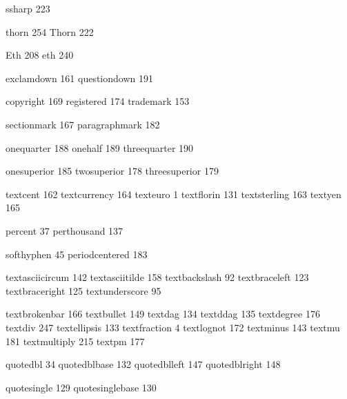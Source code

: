  ssharp           223

 thorn            254
 Thorn            222

 Eth              208
 eth              240

 exclamdown       161
 questiondown     191

 copyright        169
 registered       174
 trademark        153

 sectionmark      167
 paragraphmark    182

 onequarter       188
 onehalf          189
 threequarter     190

 onesuperior      185
 twosuperior      178
 threesuperior    179

 textcent         162 %
 textcurrency     164
 texteuro           1
 textflorin       131
 textsterling     163
 textyen          165

 percent           37
 perthousand      137

 softhyphen        45
 periodcentered   183

 textasciicircum  142
 textasciitilde   158
 textbackslash     92
 textbraceleft    123
 textbraceright   125
 textunderscore    95

 textbrokenbar    166
 textbullet       149
 textdag          134
 textddag         135
 textdegree       176
 textdiv          247
 textellipsis     133
 textfraction       4
 textlognot       172
 textminus        143
 textmu           181
 textmultiply     215
 textpm           177

 quotedbl          34
 quotedblbase     132
 quotedblleft     147
 quotedblright    148

 quotesingle      129
 quotesinglebase  130

